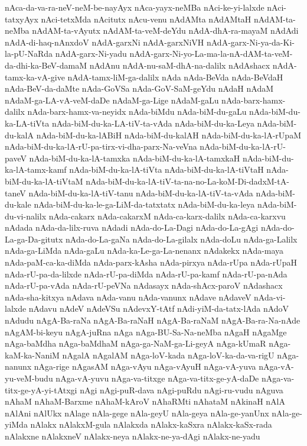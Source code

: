 {nAca-da-va-ra-neV-neM-be-nayAyx
nAca-yayx-neMBa
nAci-ke-yi-lalxde
nAci-tatxyAyx
nAci-tetxMda
nAcitutx
nAcu-venu
nAdAMta
nAdAMtaH
nAdAM-ta-neMba
nAdAM-ta-vAyutx
nAdAM-ta-veM-deYdu
nAdA-dhA-ra-mayaM
nAdAdi
nAdA-di-haq-nAnxdoV
nAdA-garxNi
nAdA-garxNiVH
nAdA-garx-Ni-ya-da-Ki-la-pU-NaRda
nAdA-garx-Ni-yadu
nAdA-garx-Ni-yo-La-ma-la-nA-dAM-ta-veM-da-dhi-ka-BeV-damaM
nAdAnu
nAdA-nu-saM-dhA-na-dalilx
nAdAshacx
nAdA-tamx-ka-vA-give
nAdA-tamx-liM-ga-dalilx
nAda
nAda-BeVda
nAda-BeVdaH
nAda-BeV-da-daMte
nAda-GoVSa
nAda-GoV-SaM-geYdu
nAdaH
nAdaM
nAdaM-ga-LA-vA-veM-daDe
nAdaM-ga-Lige
nAdaM-gaLu
nAda-barx-hamx-dalilx
nAda-barx-hamx-va-neyidx
nAda-biMdu
nAda-biM-du-gaLu
nAda-biM-du-ka-LA-tiVta
nAda-biM-du-ka-LA-tiV-ta-vAda
nAda-biM-du-ka-Leya
nAda-biM-du-kalA
nAda-biM-du-ka-lABiH
nAda-biM-du-kalAH
nAda-biM-du-ka-lA-rUpaM
nAda-biM-du-ka-lA-rU-pa-tirx-vi-dha-parx-Na-veVna
nAda-biM-du-ka-lA-rU-paveV
nAda-biM-du-ka-lA-tamxka
nAda-biM-du-ka-lA-tamxkaH
nAda-biM-du-ka-lA-tamx-kamf
nAda-biM-du-ka-lA-tiVta
nAda-biM-du-ka-lA-tiVtaH
nAda-biM-du-ka-lA-tiVtaM
nAda-biM-du-ka-lA-tiV-ta-na-no-La-koM-Di-dadxM-tA-taneV
nAda-biM-du-ka-lA-tiV-tanu
nAda-biM-du-ka-lA-tiV-ta-vAda
nAda-biM-du-kale
nAda-biM-du-ka-le-ga-LiM-da-tatxtatx
nAda-biM-du-ka-leya
nAda-biM-du-vi-nalilx
nAda-cakarx
nAda-cakarxM
nAda-ca-karx-dalilx
nAda-ca-karxvu
nAdada
nAda-da-lilx-ruva
nAdadi
nAda-do-La-Dagi
nAda-do-La-gAgi
nAda-do-La-ga-Da-gitutx
nAda-do-La-gaNa
nAda-do-La-gilalx
nAda-doLu
nAda-ga-Lalilx
nAda-ga-LiMda
nAda-gaLu
nAda-ka-Le-ga-La-nenanx
nAdakekx
nAda-maya
nAda-paM-ca-ka-diMda
nAda-parx-kAsha
nAda-pirxya
nAda-rUpa
nAda-rUpaH
nAda-rU-pa-da-lilxde
nAda-rU-pa-diMda
nAda-rU-pa-kamf
nAda-rU-pa-nAda
nAda-rU-pa-vAda
nAda-rU-peVNa
nAdasayx
nAda-shAcx-paroV
nAdashacx
nAda-sha-kitxya
nAdava
nAda-vanu
nAda-vanunx
nAdave
nAdaveV
nAda-vi-lalxde
nAdavu
nAdeV
nAdeVSu
nAdevxY-tAtf
nAdi-yiM-da-tatx-lAda
nAdoV
nAdudu
nAgA-Ba-raNa
nAgA-Ba-raNaH
nAgA-Ba-raNaM
nAgA-Ba-ra-Na-nAde
nAgAM-bi-keyu
nAgA-juRna
nAga
nAga-BU-Sa-Na-neMba
nAgaH
nAgaMge
nAga-baMdha
nAga-baMdhaM
nAga-ga-NaM-ga-Li-geyA
nAga-kUmaR
nAga-kaM-ka-NaniM
nAgalA
nAgalAM
nAga-loV-kada
nAga-loV-ka-da-va-rigU
nAga-nanunx
nAga-rige
nAgasAM
nAga-vAyu
nAga-vAyuH
nAga-vA-yuva
nAga-vA-yu-veM-budu
nAga-vA-yuvu
nAga-va-titxge
nAga-va-titx-ge-yA-daDe
nAga-va-titx-ge-yA-yi-tAtxgi
nAgi
nAgi-puR-dava
nAgi-puRdu
nAgi-ru-vudu
nAguva
nAhaM
nAhaM-Barxme
nAhaM-kAroV
nAhaRMti
nAhataM
nAkinaH
nAlA
nAlAni
nAlUkx
nAlage
nAla-gege
nAla-geyU
nAla-geya
nAla-ge-yanUnx
nAla-ge-yiMda
nAlakx
nAlakxM-gula
nAlakxda
nAlakx-kaSxra
nAlakx-kaSx-rada
nAlakxne
nAlakxneV
nAlakx-neya
nAlakx-ne-ya-dAgi
nAlakx-ne-yadu
}
